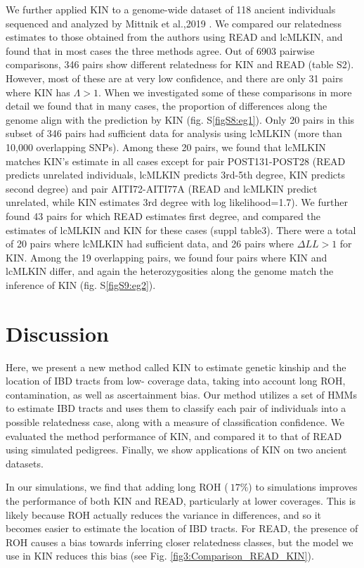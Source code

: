 \documentclass[12pt, letterpaper]{article}
\begin{document}
We further applied KIN to a genome-wide dataset of 118 ancient individuals sequenced and analyzed by Mittnik et al.,2019 \cite{mittnik_kinship-based_2019}. We compared our relatedness estimates to those obtained from the authors using READ and lcMLKIN, and found that in most cases the three methods agree. Out of 6903 pairwise comparisons, 346 pairs show different relatedness for KIN and READ (table S2). However, most of these are at very low confidence, and there are only 31 pairs where KIN has $\Lambda >1$. When we investigated some of these comparisons in more detail we found that in many cases, the proportion of differences along the genome align with the prediction by KIN (fig. S\ref{figS8:eg1}). Only 20 pairs in this subset of 346 pairs had sufficient data for analysis using lcMLKIN (more than 10,000 overlapping SNPs). Among these 20 pairs, we found that lcMLKIN matches KIN's estimate in all cases except for pair POST131-POST28 (READ predicts unrelated individuals, lcMLKIN predicts 3rd-5th degree, KIN predicts second degree) and pair AITI72-AITI77A (READ and lcMLKIN predict unrelated, while KIN estimates 3rd degree with log likelihood=1.7).  
We further found 43 pairs for which READ estimates first degree, and compared the estimates of lcMLKIN and KIN for these cases (suppl table3). There were a total of 20 pairs where lcMLKIN had sufficient data, and 26 pairs where $\Delta LL>1$ for KIN. Among the 19 overlapping pairs, we found four pairs where KIN and lcMLKIN differ, and again the heterozygosities along the genome match the inference of KIN (fig. S\ref{figS9:eg2}).  


\section{Discussion}\label{discussion}
Here, we present a new method called KIN to estimate genetic kinship and the location of IBD tracts from low- coverage data, taking into account long ROH, contamination, as well as ascertainment bias. Our method utilizes a set of HMMs to estimate IBD tracts and uses them to classify each pair of individuals into a possible relatedness case, along with a measure of classification confidence. We evaluated the method performance of KIN, and compared it to that of READ using simulated pedigrees. Finally, we show applications of KIN on two ancient datasets.


In our simulations, we find that adding long ROH ($~17\%$) to simulations improves the performance of  both KIN and READ, particularly at lower coverages. This is likely because ROH actually reduces the variance in differences, and so it becomes easier to estimate the location of IBD tracts. For READ, the presence of ROH causes a bias towards inferring closer relatedness classes, but the model we use in KIN reduces this bias  (see Fig. \ref{fig3:Comparison_READ_KIN}). 
\end{document}
